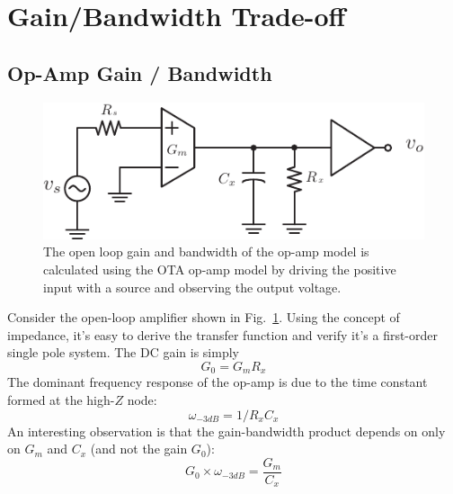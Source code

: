\section{Gain/Bandwidth Trade-off}
\subsection{Op-Amp Gain / Bandwidth}
\begin{figure}[tb]
\centering
\includegraphics[scale=1]{ota_amp_open}
\caption{The open loop gain and bandwidth of the op-amp model is calculated using the OTA op-amp model by driving the positive input with a source and observing the output voltage.}
\label{fig:ota_amp_open}
\end{figure}
Consider the open-loop amplifier shown in Fig.~\ref{fig:ota_amp_open}.  Using the concept of impedance, it's easy to derive the transfer function and verify it's a first-order single pole system.  The DC gain is simply
    \begin{equation}
        G_0 = {G_m}{R_x}
    \end{equation}
The dominant frequency response of the op-amp is due to the time constant formed at the high-$Z$ node:
    \begin{equation}
        \omega _{ - 3dB} = 1/{R_x}{C_x}
    \end{equation}
An interesting observation is that the gain-bandwidth product depends on only on $G_m$ and $C_x$ (and not the gain $G_0$): 
    \begin{equation}
        G_0 \times {\omega _{ - 3dB}} = \frac{{{G_m}}}{{{C_x}}}
    \end{equation}
